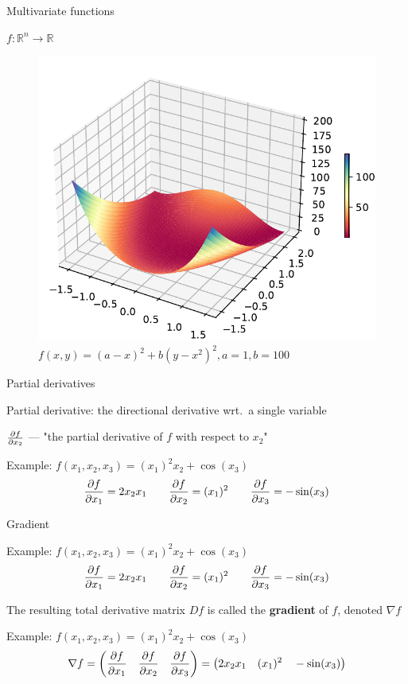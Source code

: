 \documentclass[12pt,aspectratio=169,handout]{beamer}
\begin{document}
\begin{frame}{Multivariate functions}
	
	$f: \mathbb{R}^n \to \mathbb{R}$
	
	\pause
	
	\begin{figure}
		\centering
		\includegraphics[width=0.55\linewidth]{img/rosenbrock.pdf}
		\caption{$f(x,y)=(a-x)^{2}+b(y-x^{2})^{2}, a = 1, b = 100$}
	\end{figure}
\end{frame}




\begin{frame}{Partial derivatives}
	
	Partial derivative: the directional derivative wrt.\ a single variable
	
	\bigskip
	
	$\pdv{f}{x_2}$ --- "the partial derivative of $f$ with respect to $x_2$"
	
	\bigskip
	
	\begin{block}{Example: $f(x_1, x_2, x_3) = (x_1)^2 x_2 + \cos(x_3)$}
		$$
		\pdv{f}{x_1} = 2 x_2 x_1 \qquad \pdv{f}{x_2} = (x_1)^2 \qquad \pdv{f}{x_3} = - \sin (x_3)
		$$
	\end{block}
	
	
\end{frame}


\begin{frame}{Gradient}
	
	\begin{block}{Example: $f(x_1, x_2, x_3) = (x_1)^2 x_2 + \cos(x_3)$}
		$$
		\pdv{f}{x_1} = 2 x_2 x_1 \qquad \pdv{f}{x_2} = (x_1)^2 \qquad \pdv{f}{x_3} = - \sin (x_3)
		$$
	\end{block}
	
	
	The resulting total derivative matrix $Df$ is called the \textbf{gradient} of $f$, denoted $\nabla f$
	
	\begin{block}{Example: $f(x_1, x_2, x_3) = (x_1)^2 x_2 + \cos(x_3)$}
		$$
		\nabla f = \left( \pdv{f}{x_1} \quad \pdv{f}{x_2} \quad \pdv{f}{x_3} \right) = 
		\left(
		2 x_2 x_1  \quad (x_1)^2  \quad - \sin (x_3)
		\right)
		$$
	\end{block}
	
	
\end{frame}
\end{document}
